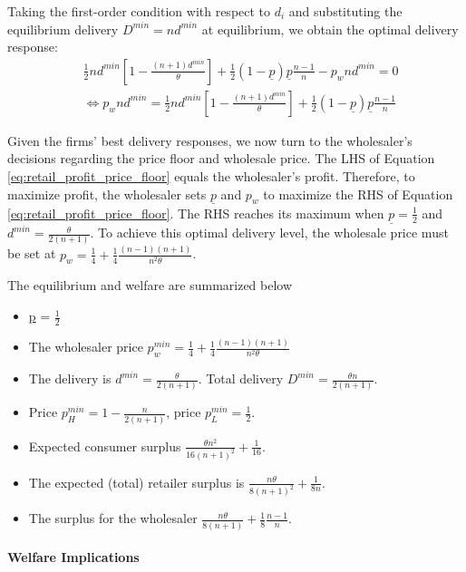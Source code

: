 \documentclass[12pt]{article}
\begin{document}
Taking the first-order condition with respect to $d_i$ and substituting the equilibrium delivery $D^{min} = nd^{min}$ at equilibrium, we obtain the optimal delivery response:
\begin{equation}\label{eq:retail_profit_price_floor}
	\begin{aligned}
		& \frac{1}{2}nd^{min}\left[1 - \frac{(n+1)d^{min}}{\theta}\right] + \frac{1}{2}(1-\underline{p})\underline{p}\frac{n-1}{n} -  p_wnd^{min} = 0 \\
		& \iff  p_wnd^{min} = \frac{1}{2}nd^{min}\left[1 - \frac{(n+1)d^{min}}{\theta}\right] + \frac{1}{2}(1-\underline{p})\underline{p}\frac{n-1}{n}
	\end{aligned}
\end{equation}

Given the firms' best delivery responses, we now turn to the wholesaler's decisions regarding the price floor and wholesale price.
The LHS of Equation \eqref{eq:retail_profit_price_floor} equals the wholesaler's profit. Therefore, to maximize profit, the wholesaler sets $\underline{p}$ and $ p_w$ to maximize the RHS of Equation \eqref{eq:retail_profit_price_floor}. The RHS reaches its maximum when $\underline{p} = \frac{1}{2}$ and $d^{min} = \frac{\theta}{2(n + 1)}$. To achieve this optimal delivery level, the wholesale price must be set at $ p_w = \frac{1}{4} + \frac{1}{4}\frac{(n - 1)(n + 1)}{n^2\theta}$.

The equilibrium and welfare are summarized below
\begin{itemize}
	\item \underline{p} = $\frac{1}{2}$
	\item The wholesaler price  $ p_w^{min} = \frac{1}{4} + \frac{1}{4}\frac{(n - 1)(n + 1)}{n^2\theta}$ 
	\item The delivery is $d^{min} = \frac{\theta}{2(n + 1)}$. Total delivery $D^{min} = \frac{\theta n}{2(n + 1)}$. 
	\item Price $p^{min}_{H} = 1 - \frac{n}{2(n+1)}$, price $p^{min}_L = \frac{1}{2}$.
	\item Expected consumer surplus $\frac{\theta n^2}{16(n + 1)^2} + \frac{1}{16}$. 
	\item The expected (total) retailer surplus is $\frac{n\theta}{8(n+1)^2} + \frac{1}{8n}$. 
	\item The surplus for the wholesaler $\frac{n\theta}{8(n+1)} + \frac{1}{8}\frac{n-1}{n}$.
\end{itemize}  

\paragraph{Welfare Implications}
\end{document}
